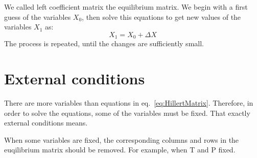 \documentclass[12pt]{article}
\begin{document}
We called left coefficient matrix the equilibrium matrix.
We begin with a first guess of the variables $X_0$, then solve this 
equations to get new values of the variables $X_1$ as:
\begin{equation}
X_1 = X_0 + \Delta X
\end{equation}
The process is repeated, until the changes are sufficiently small.

\section{External conditions}

There are more variables than equations in eq.~\ref{eq:HillertMatrix}. Therefore, in 
order to solve the equations, some of the variables must be fixed. That exactly
external conditions means. 

When some variables are fixed, the corresponding columns and rows in the euqilibrium matrix
should be removed. For example, when T and P fixed.

\label{eq:fixed T and P}
\end{document}
